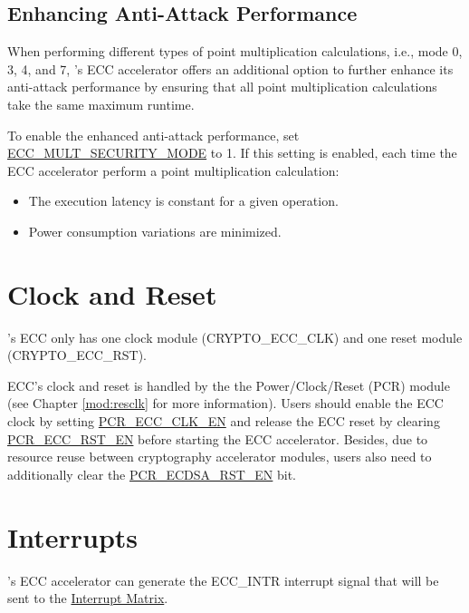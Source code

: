 \documentclass[main\_\_EN.tex]{subfiles}
\begin{document}
\subsection{Enhancing Anti-Attack Performance}
\label{sec:ecc-anti-attack}

When performing different types of point multiplication calculations, i.e., mode 0, 3, 4, and 7, \chipname{}'s ECC accelerator offers an additional option to further enhance its anti-attack performance by ensuring that all point multiplication calculations take the same maximum runtime.

To enable the enhanced anti-attack performance, set \hyperref[fielddesc:ECCMULTSECURITYMODE]{ECC\_MULT\_SECURITY\_MODE} to 1. If this setting is enabled, each time the ECC accelerator perform a point multiplication calculation:

\begin{itemize}
    \item The execution latency is constant for a given operation.
    \item Power consumption variations are minimized.
\end{itemize}

\section{Clock and Reset}
\label{sec:ecc-clkrst}

\chipname{}'s ECC only has one clock module (CRYPTO\_ECC\_CLK) and one reset module (CRYPTO\_ECC\_RST).

ECC's clock and reset is handled by the the Power/Clock/Reset (PCR) module (see Chapter \ref{mod:resclk} \textit{} for more information). Users should enable the ECC clock by setting \hyperref[fielddesc:PCRECCCLKEN]{PCR\_ECC\_CLK\_EN} and release the ECC reset by clearing \hyperref[fielddesc:PCRECCRSTEN]{PCR\_ECC\_RST\_EN} before starting the ECC accelerator. Besides, due to resource reuse between cryptography accelerator modules, users also need to additionally clear the \hyperref[fielddesc:PCRECDSARSTEN]{PCR\_ECDSA\_RST\_EN} bit.


\section{Interrupts}
\label{sec:ecc-interrupt}

\chipname{}'s ECC accelerator can generate the ECC\_INTR interrupt signal that will be sent to the \hyperref[mod:intmtrx]{Interrupt Matrix}.
\end{document}
